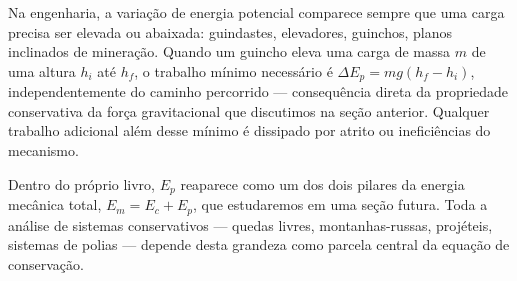 Na engenharia, a variação de energia potencial comparece sempre que
uma carga precisa ser elevada ou abaixada: guindastes, elevadores,
guinchos, planos inclinados de mineração. Quando um guincho eleva uma
carga de massa $m$ de uma altura $h_i$ até $h_f$, o trabalho mínimo
necessário é $\Delta E_p = mg(h_f - h_i)$, independentemente do
caminho percorrido --- consequência direta da propriedade conservativa
da força gravitacional que discutimos na seção anterior. Qualquer trabalho
adicional além desse mínimo é dissipado por atrito ou ineficiências
do mecanismo.

Dentro do próprio livro, $E_p$ reaparece como um dos dois pilares da
energia mecânica total, $E_m = E_c + E_p$, que estudaremos em uma seção
futura. Toda a análise de sistemas conservativos --- quedas livres,
montanhas-russas, projéteis, sistemas de polias --- depende desta
grandeza como parcela central da equação de conservação. 




